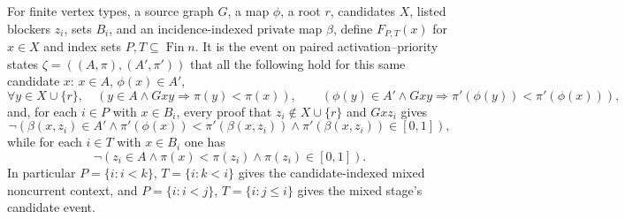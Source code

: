 \begin{definition}
For finite vertex types, a source graph \(G\), a map \(\phi\), a root
\(r\), candidates \(X\), listed blockers \(z_i\), sets \(B_i\), and an
incidence-indexed private map \(\beta\), define \(F_{P,T}(x)\) for
\(x\in X\) and index sets \(P,T\subseteq\operatorname{Fin}n\).
It is the event on paired activation--priority states
\(\zeta=((A,\pi),(A',\pi'))\) that all the following hold for this same
candidate \(x\):
\(x\in A\), \(\phi(x)\in A'\),
\[
\forall y\in X\cup\{r\},\quad
 (y\in A\land Gxy\Rightarrow\pi(y)<\pi(x)),\qquad
 (\phi(y)\in A'\land Gxy\Rightarrow\pi'(\phi(y))<\pi'(\phi(x))),
\]
and, for each \(i\in P\) with \(x\in B_i\), every proof that
\(z_i\notin X\cup\{r\}\) and \(Gxz_i\) gives
\[
 \neg(\beta(x,z_i)\in A'\land
 \pi'(\phi(x))<\pi'(\beta(x,z_i))\land\pi'(\beta(x,z_i))\in[0,1]),
\]
while for each \(i\in T\) with \(x\in B_i\) one has
\[
 \neg(z_i\in A\land\pi(x)<\pi(z_i)\land\pi(z_i)\in[0,1]).
\]
In particular \(P=\{i:i<k\}\), \(T=\{i:k<i\}\) gives the
candidate-indexed mixed noncurrent context, and \(P=\{i:i<j\}\),
\(T=\{i:j\le i\}\) gives the mixed stage's candidate event.
\end{definition}
